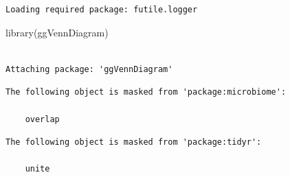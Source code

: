 \documentclass[
  letterpaper,
  DIV=11,
  numbers=noendperiod]{scrartcl}
\newenvironment{Shaded}{\begin{snugshade}}{\end{snugshade}}
\newcommand{\FunctionTok}[1]{\textcolor[rgb]{0.28,0.35,0.67}{#1}}
\newcommand{\NormalTok}[1]{\textcolor[rgb]{0.00,0.23,0.31}{#1}}
\begin{document}
\begin{verbatim}
Loading required package: futile.logger
\end{verbatim}

\begin{Shaded}
\begin{Highlighting}[]
\FunctionTok{library}\NormalTok{(ggVennDiagram)}
\end{Highlighting}
\end{Shaded}

\begin{verbatim}

Attaching package: 'ggVennDiagram'
\end{verbatim}

\begin{verbatim}
The following object is masked from 'package:microbiome':

    overlap
\end{verbatim}

\begin{verbatim}
The following object is masked from 'package:tidyr':

    unite
\end{verbatim}
\end{document}
